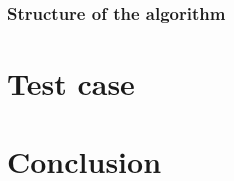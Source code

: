 \subsubsection{Structure of the algorithm}


%	

\IncMargin{2em}
\begin{figure}[p]
\begin{fullpage}
	
\end{fullpage}
\end{figure}
\DecMargin{2em}

\clearpage

\clearpage
\section{Test case}\label{sec:testcase}

\clearpage

\section{Conclusion}


